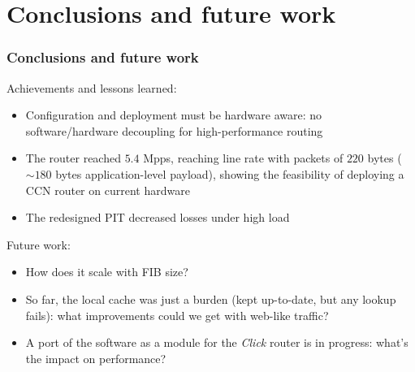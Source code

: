 \section{Conclusions and future work}
\begin{frame}[fragile]
  \frametitle{Conclusions and future work}
  Achievements and lessons learned:
  \onslide<+->
  \begin{itemize}
    \item<+-> Configuration and deployment must be hardware aware: no software/hardware decoupling for high-performance routing
    \item<+-> The router reached $5.4$ Mpps, reaching line rate with packets of $220$ bytes ($\sim180$ bytes application-level payload), showing the feasibility of deploying a CCN router on current hardware
    \item<+-> The redesigned PIT decreased losses under high load
  \end{itemize}

  \onslide<+->
  Future work:
  \begin{itemize}
    \item How does it scale with FIB size?
    \item So far, the local cache was just a burden (kept up-to-date, but any lookup fails): what improvements could we get with web-like traffic?
    \item A port of the software as a module for the \emph{Click} router is in progress: what's the impact on performance?
  \end{itemize}
\end{frame}

